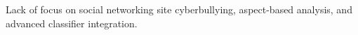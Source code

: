 Lack of focus on social networking site cyberbullying, aspect-based analysis, and advanced classifier integration.